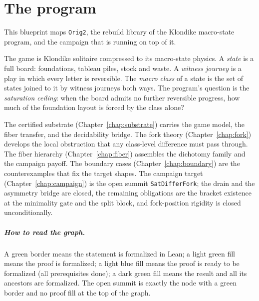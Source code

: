 %

\chapter{The program}
\label{chap:program}

This blueprint maps \texttt{Orig2}, the rebuild library of the
Klondike macro-state program, and the campaign that is running on
top of it.

The game is Klondike solitaire compressed to its macro-state
physics.  A \emph{state} is a full board: foundations, tableau
piles, stock and waste.  A \emph{witness journey} is a play in
which every letter is reversible.  The \emph{macro class} of a
state is the set of states joined to it by witness journeys both
ways.  The program's question is the \emph{saturation ceiling}:
when the board admits no further reversible progress, how much of
the foundation layout is forced by the class alone?

The certified substrate (Chapter~\ref{chap:substrate}) carries
the game model, the fiber transfer, and the decidability bridge.
The fork theory (Chapter~\ref{chap:fork}) develops the local
obstruction that any class-level difference must pass through.
The fiber hierarchy (Chapter~\ref{chap:fiber}) assembles the
dichotomy family and the campaign payoff.  The boundary cases
(Chapter~\ref{chap:boundary}) are the counterexamples that fix the
target shapes.  The campaign target (Chapter~\ref{chap:campaign})
is the open summit \texttt{SatDifferFork}; the drain and the
asymmetry bridge are closed, the remaining obligations are the
bracket existence at the minimality gate and the split block, and
fork-position rigidity is closed unconditionally.

\paragraph{How to read the graph.}  A green border means the
statement is formalized in Lean; a light green fill means the
proof is formalized; a light blue fill means the proof is ready to
be formalized (all prerequisites done); a dark green fill means
the result and all its ancestors are formalized.  The open
summit is exactly the node with a green border and no proof fill
at the top of the graph.

